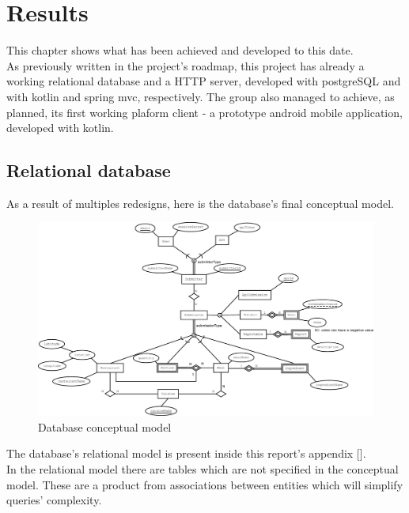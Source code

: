 %
%
\chapter{Results}

This chapter shows what has been achieved and developed to this date.\\

As previously written in the project's roadmap, this project has already a working relational database
and a HTTP server, developed with postgreSQL and with kotlin and spring mvc, respectively. The group also
managed to achieve, as planned, its first working plaform client - a prototype android mobile application, developed
with kotlin.

\section{Relational database}

As a result of multiples redesigns, here is the database's final conceptual model.

\begin{figure}[H]    
    \includegraphics[scale=0.25]{_figures/Nutr.io_Database_Diagram.eps}
    \caption{Database conceptual model}
\end{figure}

\newpage
The database's relational model is present inside this report's appendix [].\\

In the relational model there are tables which are not specified in the conceptual model.
These are a product from associations between entities which will simplify queries' complexity.\\

